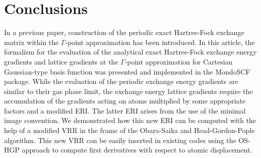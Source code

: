 \documentclass[prl,twocolumn,showpacs,twocolumngrid,superbib]{revtex4}
\begin{document}

\section{Conclusions}\label{Sec:Conclusions}

In a previous paper, construction of the periodic exact Hartree-Fock exchange 
matrix within the $\Gamma$-point approximation
has been introduced. In this article, the formalism for the evaluation of 
the analytical exact Hartree-Fock exchange energy gradients and lattice gradients at 
the $\Gamma$-point approximation for Cartesian Gaussian-type basis function 
was presented and implemented in the {\sc MondoSCF} package. 
While the evaluation of the periodic exchange energy gradients are similar to their 
gas phase limit, the exchange energy lattice gradients require the accumulation of 
the gradients acting on atoms multiplied by some appropriate factors and a 
modified ERI. The latter ERI arises from the use of the minimal image convention. 
We demonstrated how this new ERI can be computed with the help of a modified VRR 
in the frame of the Obara-Saika and Head-Gordon-Pople algorithm. This new VRR can
be easily inserted in existing codes using the OS-HGP approach to compute 
first derivatives with respect to atomic displacement. 
\end{document}
